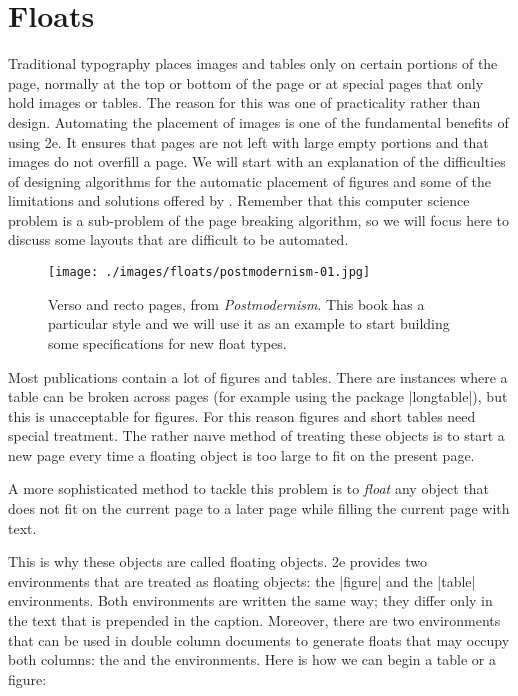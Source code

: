 
\chapter{Floats}

Traditional typography places images and tables only on certain portions of the page, normally at the top or bottom of the page or at special pages that only hold images or tables. The reason for this was one of practicality rather than design. 
Automating the placement of images is one of the fundamental benefits of using \latex2e. It ensures that pages are not left with large empty portions and that images do not overfill a page. We will start with an explanation of the difficulties of designing algorithms for the automatic placement of figures and some of the limitations and solutions offered by \latexe. Remember that this computer science problem is a sub-problem of the page breaking algorithm, so we will focus here to discuss some layouts that are difficult to be automated. 

\begin{figure}[htb]
\parindent=0pt
\texttt{[image: ./images/floats/postmodernism-01.jpg]}
\caption{Verso and recto pages, from \textit{Postmodernism}. This book has a particular style and we will use it as an example to start building some specifications for new float types.}
\label{fig:postmodern1}
\end{figure}

Most publications contain a lot of figures and tables. There are instances where
a table can be broken across pages (for example using the package |longtable|), but this is unacceptable for figures. For this reason
figures and short tables need special treatment. The rather naıve method of treating these
objects is to start a new page every time a floating object is too large to fit on the present
page. 

A more sophisticated method to tackle this problem is to \emph{float} any object that
does not fit on the current page to a later page while filling the current page with text.

This is why these objects are called floating objects. \latex2e provides two environments
that are treated as floating objects: the |figure| and the |table| environments. Both environments
are written the same way; they differ only in the text that is prepended in the
caption. Moreover, there are two environments that can be used in double column documents
to generate floats that may occupy both columns: the  and the 
environments. Here is how we can begin a table or a figure:

